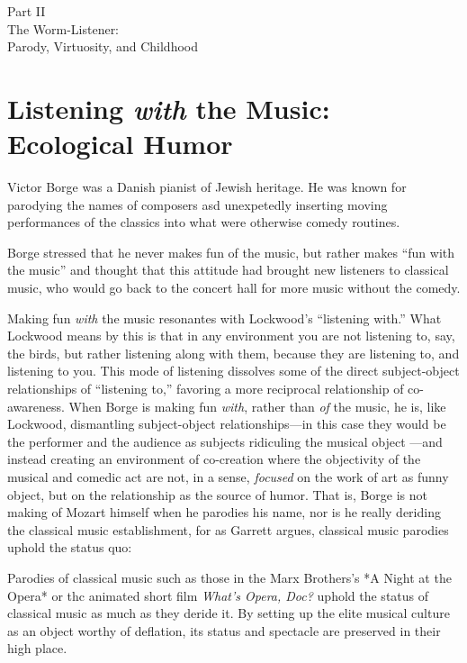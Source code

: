 \documentclass[12pt,letterpaper]{article}
\begin{document}
	\newpage
	\thispagestyle{empty}
	\vspace*{30pt}
	\begin{center}
	{\Huge Part II\\ 
	\Large The Worm-Listener:\\
	Parody, Virtuosity, and Childhood}
	\end{center}


	\newpage
	\section*{Listening \textit{with} the Music: Ecological Humor} 

	Victor Borge was a Danish pianist of Jewish heritage. He was known for 
	parodying the names of composers asd unexpetedly inserting moving 
	performances of the classics into what were otherwise comedy 
	routines.\autocite[255]{Garrett}  

	Borge stressed that he never makes fun of the music, but rather makes 
	``fun with the music'' and thought that this attitude had brought new 
	listeners to classical music, who would go back to the concert hall for 	more music without the comedy.\autocite[256]{Garrett}

	Making fun \textit{with} the music resonantes with Lockwood's 
	``listening with.'' What Lockwood means by this is that in any 
	environment you are not listening to, say, the birds, but rather 
	listening along with them, because they are listening to, and listening
	to you. This mode of listening dissolves some of the direct 
	subject-object relationships of ``listening to,'' favoring a more 
	reciprocal relationship of co-awareness.  When Borge is making fun 
	\textit{with}, rather than \textit{of} the music, he is, like Lockwood, 
	dismantling subject-object relationships---in this case they would be 
	the performer and the audience as subjects ridiculing the musical object
	---and instead creating an environment of co-creation where the 
	objectivity of the musical and comedic act are not, in a sense, 
	\textit{focused} on the work of art as funny object, but on the 
	relationship as the source of humor. That is, Borge is not making of 
	Mozart himself when he parodies his name, nor is he really deriding the
 	classical music establishment, for as Garrett argues, classical music 
	parodies uphold the status quo: 

	Parodies of classical music such as those in the Marx Brothers's *A 
	Night at the Opera* or thc animated short film \textit{What's Opera, 
	Doc?} uphold the status of classical music as much as they deride it. By
	setting up the elite musical culture as an object worthy of deflation, 
	its status and spectacle are preserved in their high 
	place.\autocite[252]{Garrett}  
	 
\end{document}
